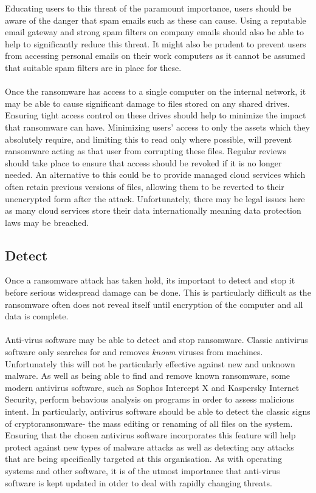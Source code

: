 \documentclass{article}
\begin{document}
Educating users to this threat of the paramount importance, users should be aware of the danger that spam emails such as these can cause.
Using a reputable email gateway and strong spam filters on company emails should also be able to help to significantly reduce this threat. It might also be prudent to prevent users from accessing personal emails on their work computers as it cannot be assumed that suitable spam filters are in place for these.
\\\\
Once the ransomware has access to a single computer on the internal network, it may be able to cause significant damage to files stored on any shared drives.
Ensuring tight access control on these drives should help to minimize the impact that ransomware can have. Minimizing users' access to only the assets which they absolutely require, and limiting this to read only where possible, will prevent ransomware acting as that user from corrupting these files.
Regular reviews should take place to ensure that access should be revoked if it is no longer needed.
An alternative to this could be to provide managed cloud services which often retain previous versions of files, allowing them to be reverted to their unencrypted form after the attack. Unfortunately, there may be legal issues here as many cloud services store their data internationally meaning data protection laws may be breached.

\subsection{Detect}
Once a ransomware attack has taken hold, its important to detect and stop it before serious widespread damage can be done. This is particularly difficult as the ransomware often does not reveal itself until encryption of the computer and all data is complete.
\\\\
Anti-virus software may be able to detect and stop ransomware. Classic antivirus software only searches for and removes \textit{known} viruses from machines. Unfortunately this will not be particularly effective against new and unknown malware.
As well as being able to find and remove known ransomware, some modern antivirus software, such as Sophos Intercept X\cite{intercept-x} and Kaspersky Internet Security\cite{kaspersky-is}, perform behavious analysis on programs in order to assess malicious intent.
In particularly, antivirus software should be able to detect the classic signs of cryptoransomware- the mass editing or renaming of all files on the system.
Ensuring that the chosen antivirus software incorporates this feature will help protect against new types of malware attacks as well as detecting any attacks that are being specifically targeted at this organisation. As with operating systems and other software, it is of the utmost importance that anti-virus software is kept updated in otder to deal with rapidly changing threats.
\end{document}

